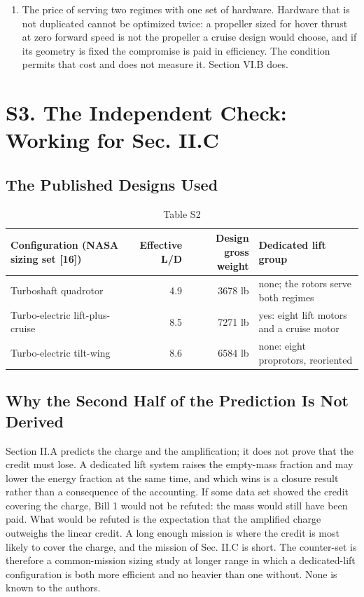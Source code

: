 \documentclass[journal]{new-aiaa}
\begin{document}
\begin{enumerate}[label=\arabic*)]
\item The price of serving two regimes with one set of hardware. Hardware that is not duplicated cannot be optimized twice: a propeller sized for hover thrust at zero forward speed is not the propeller a cruise design would choose, and if its geometry is fixed the compromise is paid in efficiency. The condition permits that cost and does not measure it. Section VI.B does.
\end{enumerate}

\section*{S3. The Independent Check: Working for Sec. II.C}

\subsection*{The Published Designs Used}

\begin{table}[htbp]
\centering
\caption*{Table S2}
\small
\begin{tabularx}{\linewidth}{XrrX}
\hline
Configuration (NASA sizing set [16]) & Effective L/D & Design gross weight & Dedicated lift group \\ \hline
Turboshaft quadrotor & 4.9 & 3678 lb & none; the rotors serve both regimes \\
Turbo-electric lift-plus-cruise & 8.5 & 7271 lb & yes: eight lift motors and a cruise motor \\
Turbo-electric tilt-wing & 8.6 & 6584 lb & none: eight proprotors, reoriented \\
\hline
\end{tabularx}
\end{table}

\subsection*{Why the Second Half of the Prediction Is Not Derived}

Section II.A predicts the charge and the amplification; it does not prove that the credit must lose. A dedicated lift system raises the empty-mass fraction and may lower the energy fraction at the same time, and which wins is a closure result rather than a consequence of the accounting. If some data set showed the credit covering the charge, Bill 1 would not be refuted: the mass would still have been paid. What would be refuted is the expectation that the amplified charge outweighs the linear credit. A long enough mission is where the credit is most likely to cover the charge, and the mission of Sec. II.C is short. The counter-set is therefore a common-mission sizing study at longer range in which a dedicated-lift configuration is both more efficient and no heavier than one without. None is known to the authors.
\end{document}
